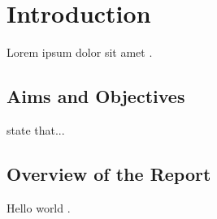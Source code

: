 \chapter{Introduction}

Lorem ipsum dolor sit amet \cite{Reference1}.

\section{Aims and Objectives}

\citet{Reference2} state that...

\section{Overview of the Report}

Hello world \cite{Reference3}. 
